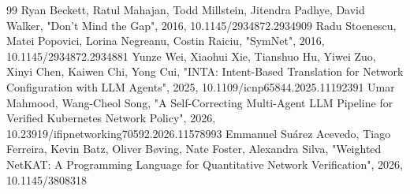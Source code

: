 \documentclass[conference]{IEEEtran}
\begin{document}
\begin{thebibliography}{99}
 Ryan Beckett, Ratul Mahajan, Todd Millstein, Jitendra Padhye, David Walker, "Don't Mind the Gap", 2016, 10.1145/2934872.2934909
 Radu Stoenescu, Matei Popovici, Lorina Negreanu, Costin Raiciu, "SymNet", 2016, 10.1145/2934872.2934881
 Yunze Wei, Xiaohui Xie, Tianshuo Hu, Yiwei Zuo, Xinyi Chen, Kaiwen Chi, Yong Cui, "INTA: Intent-Based Translation for Network Configuration with LLM Agents", 2025, 10.1109/icnp65844.2025.11192391
 Umar Mahmood, Wang-Cheol Song, "A Self-Correcting Multi-Agent LLM Pipeline for Verified Kubernetes Network Policy", 2026, 10.23919/ifipnetworking70592.2026.11578993
 Emmanuel Suárez Acevedo, Tiago Ferreira, Kevin Batz, Oliver Bøving, Nate Foster, Alexandra Silva, "Weighted NetKAT: A Programming Language for Quantitative Network Verification", 2026, 10.1145/3808318
\end{thebibliography}
\end{document}
